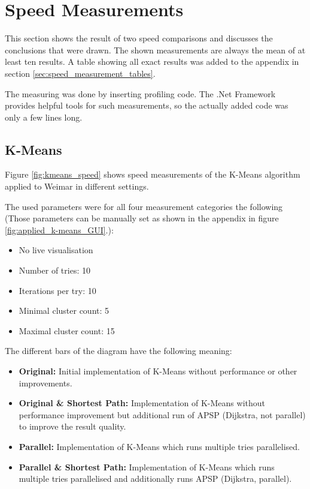 \section{Speed Measurements} \label{sec:measurements-speed}
This section shows the result of two speed comparisons and discusses the conclusions that were drawn. The shown measurements are always the mean of at least ten results. A table showing all exact results was added to the appendix in section \ref{sec:speed_measurement_tables}.

The measuring was done by inserting profiling code. The .Net Framework provides helpful tools for such measurements, so the actually added code was only a few lines long.

\subsection{K-Means}
Figure \ref{fig:kmeans_speed} shows speed measurements of the K-Means algorithm applied to Weimar in different settings.

The used parameters were for all four measurement categories the following (Those parameters can be manually set as shown in the appendix in figure \ref{fig:applied_k-means_GUI}.):

\begin{itemize}
    \item No live visualisation
    \item Number of tries: 10
    \item Iterations per try: 10
    \item Minimal cluster count: 5
    \item Maximal cluster count: 15
\end{itemize}

The different bars of the diagram have the following meaning:

\begin{itemize}
    \item \textbf{Original:} Initial implementation of K-Means without performance or other improvements.
    \item \textbf{Original \& Shortest Path:} Implementation of K-Means without performance improvement but additional run of \acrshort{APSP} (Dijkstra, not parallel) to improve the result quality.
    \item \textbf{Parallel:} Implementation of K-Means which runs multiple tries parallelised.
    \item \textbf{Parallel \& Shortest Path:} Implementation of K-Means which runs multiple tries parallelised and additionally runs \acrshort{APSP} (Dijkstra, parallel).
\end{itemize}

